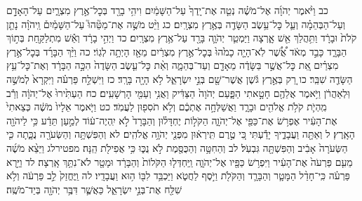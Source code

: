 \documentclass[twoside, openany, parskip=half, 11pt]{book}
\begin{document}
כב וַיֹּ֨אמֶר יְהֹוָ֜ה אֶל־מֹשֶׁ֗ה נְטֵ֤ה אֶת־יָֽדְךָ֙ עַל־הַשָּׁמַ֔יִם וִיהִ֥י בָרָ֖ד בְּכׇל־אֶ֣רֶץ מִצְרָ֑יִם עַל־הָאָדָ֣ם וְעַל־הַבְּהֵמָ֗ה וְעַ֛ל כׇּל־עֵ֥שֶׂב הַשָּׂדֶ֖ה בְּאֶ֥רֶץ מִצְרָֽיִם׃ כג וַיֵּ֨ט מֹשֶׁ֣ה אֶת־מַטֵּ֘הוּ֮ עַל־הַשָּׁמַ֒יִם֒ וַֽיהֹוָ֗ה נָתַ֤ן קֹלֹת֙ וּבָרָ֔ד וַתִּ֥הֲלַךְ אֵ֖שׁ אָ֑רְצָה וַיַּמְטֵ֧ר יְהֹוָ֛ה בָּרָ֖ד עַל־אֶ֥רֶץ מִצְרָֽיִם׃ כד וַיְהִ֣י בָרָ֔ד וְאֵ֕שׁ מִתְלַקַּ֖חַת בְּת֣וֹךְ הַבָּרָ֑ד כָּבֵ֣ד מְאֹ֔ד אֲ֠שֶׁ֠ר לֹֽא־הָיָ֤ה כָמֹ֙הוּ֙ בְּכׇל־אֶ֣רֶץ מִצְרַ֔יִם מֵאָ֖ז הָיְתָ֥ה לְגֽוֹי׃ כה וַיַּ֨ךְ הַבָּרָ֜ד בְּכׇל־אֶ֣רֶץ מִצְרַ֗יִם אֵ֚ת כׇּל־אֲשֶׁ֣ר בַּשָּׂדֶ֔ה מֵאָדָ֖ם וְעַד־בְּהֵמָ֑ה וְאֵ֨ת כׇּל־עֵ֤שֶׂב הַשָּׂדֶה֙ הִכָּ֣ה הַבָּרָ֔ד וְאֶת־כׇּל־עֵ֥ץ הַשָּׂדֶ֖ה שִׁבֵּֽר׃ כו רַ֚ק בְּאֶ֣רֶץ גֹּ֔שֶׁן אֲשֶׁר־שָׁ֖ם בְּנֵ֣י יִשְׂרָאֵ֑ל לֹ֥א הָיָ֖ה בָּרָֽד׃ כז וַיִּשְׁלַ֣ח פַּרְעֹ֗ה וַיִּקְרָא֙ לְמֹשֶׁ֣ה וּֽלְאַהֲרֹ֔ן וַיֹּ֥אמֶר אֲלֵהֶ֖ם חָטָ֣אתִי הַפָּ֑עַם יְהֹוָה֙ הַצַּדִּ֔יק וַאֲנִ֥י וְעַמִּ֖י הָרְשָׁעִֽים׃ כח הַעְתִּ֙ירוּ֙ אֶל־יְהֹוָ֔ה וְרַ֕ב מִֽהְיֹ֛ת קֹלֹ֥ת אֱלֹהִ֖ים וּבָרָ֑ד וַאֲשַׁלְּחָ֣ה אֶתְכֶ֔ם וְלֹ֥א תֹסִפ֖וּן לַעֲמֹֽד׃ כט וַיֹּ֤אמֶר אֵלָיו֙ מֹשֶׁ֔ה כְּצֵאתִי֙ אֶת־הָעִ֔יר אֶפְרֹ֥שׂ אֶת־כַּפַּ֖י אֶל־יְהֹוָ֑ה הַקֹּל֣וֹת יֶחְדָּל֗וּן וְהַבָּרָד֙ לֹ֣א יִֽהְיֶה־ע֔וֹד לְמַ֣עַן תֵּדַ֔ע כִּ֥י לַיהֹוָ֖ה הָאָֽרֶץ׃ ל וְאַתָּ֖ה וַעֲבָדֶ֑יךָ יָדַ֕עְתִּי כִּ֚י טֶ֣רֶם תִּֽירְא֔וּן מִפְּנֵ֖י יְהֹוָ֥ה אֱלֹהִֽים׃ לא וְהַפִּשְׁתָּ֥ה וְהַשְּׂעֹרָ֖ה נֻכָּ֑תָה כִּ֤י הַשְּׂעֹרָה֙ אָבִ֔יב וְהַפִּשְׁתָּ֖ה גִּבְעֹֽל׃ לב וְהַחִטָּ֥ה וְהַכֻּסֶּ֖מֶת לֹ֣א נֻכּ֑וּ כִּ֥י אֲפִילֹ֖ת הֵֽנָּה׃ מפטירלג וַיֵּצֵ֨א מֹשֶׁ֜ה מֵעִ֤ם פַּרְעֹה֙ אֶת־הָעִ֔יר וַיִּפְרֹ֥שׂ כַּפָּ֖יו אֶל־יְהֹוָ֑ה וַֽיַּחְדְּל֤וּ הַקֹּלוֹת֙ וְהַבָּרָ֔ד וּמָטָ֖ר לֹא־נִתַּ֥ךְ אָֽרְצָה׃ לד וַיַּ֣רְא פַּרְעֹ֗ה כִּֽי־חָדַ֨ל הַמָּטָ֧ר וְהַבָּרָ֛ד וְהַקֹּלֹ֖ת וַיֹּ֣סֶף לַחֲטֹ֑א וַיַּכְבֵּ֥ד לִבּ֖וֹ ה֥וּא וַעֲבָדָֽיו׃ לה וַֽיֶּחֱזַק֙ לֵ֣ב פַּרְעֹ֔ה וְלֹ֥א שִׁלַּ֖ח אֶת־בְּנֵ֣י יִשְׂרָאֵ֑ל כַּאֲשֶׁ֛ר דִּבֶּ֥ר יְהֹוָ֖ה בְּיַד־מֹשֶֽׁה׃
\end{document}
